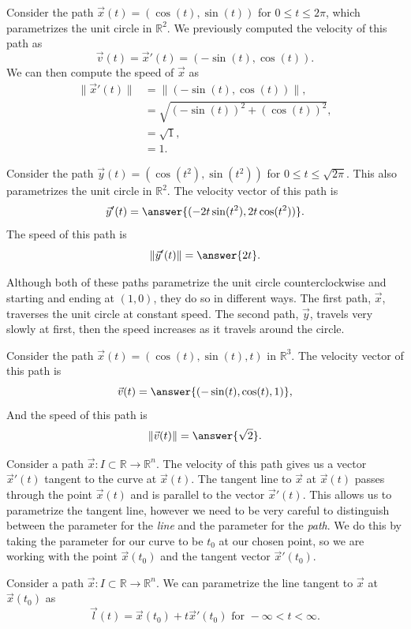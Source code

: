 \documentclass{ximera}
\begin{document}
\begin{example}
Consider the path $\vec{x}(t) = (\cos(t), \sin(t))$ for $0\leq t \leq 2\pi$, which parametrizes the unit circle in $\mathbb{R}^2$. We previously computed the velocity of this path as
\[
\vec{v}(t) = \vec{x}'(t) = (-\sin(t), \cos(t)).
\]
We can then compute the speed of $\vec{x}$ as
\begin{align*}
\|\vec{x}'(t)\| &= \|(-\sin(t), \cos(t))\|,\\
&= \sqrt{(-\sin(t))^2 + (\cos(t))^2},\\
& = \sqrt{1},\\
& = 1.
\end{align*}

Consider the path $\vec{y}(t) = (\cos(t^2), \sin(t^2))$ for $0\leq t\leq \sqrt{2\pi}$. This also parametrizes the unit circle in $\mathbb{R}^2$. The velocity vector of this path is
\[
\vec{y}'(t) = \answer{(-2t\sin(t^2), 2t\cos(t^2))}.
\]
The speed of this path is
\[
\|\vec{y}'(t)\| = \answer{2t}.
\]

Although both of these paths parametrize the unit circle counterclockwise and starting and ending at $(1,0)$, they do so in different ways. The first path, $\vec{x}$, traverses the unit circle at constant speed. The second path, $\vec{y}$, travels very slowly at first, then the speed increases as it travels around the circle.
\end{example}

\begin{example}
Consider the path $\vec{x}(t)=(\cos(t),\sin(t),t)$ in $\mathbb{R}^3$. The velocity vector of this path is
\[
\vec{v}(t) = \answer{(-\sin(t),\cos(t),1)},
\]
And the speed of this path is
\[
\|\vec{v}(t)\| = \answer{\sqrt{2}}.
\]
\end{example}

Consider a path $\vec{x}:I\subset\mathbb{R}\rightarrow\mathbb{R}^n$. The velocity of this path gives us a vector $\vec{x}'(t)$ tangent to the curve at $\vec{x}(t)$. The tangent line to $\vec{x}$ at $\vec{x}(t)$ passes through the point $\vec{x}(t)$ and is parallel to the vector $\vec{x}'(t)$. This allows us to parametrize the tangent line, however we need to be very careful to distinguish between the parameter for the \emph{line} and the parameter for the \emph{path}. We do this by taking the parameter for our curve to be $t_0$ at our chosen point, so we are working with the point $\vec{x}(t_0)$ and the tangent vector $\vec{x}'(t_0)$.

\begin{proposition}
Consider a path $\vec{x}:I\subset\mathbb{R}\rightarrow\mathbb{R}^n$. We can parametrize the line tangent to $\vec{x}$ at $\vec{x}(t_0)$ as
\[
\vec{l}(t) = \vec{x}(t_0) + t\vec{x}'(t_0) \textrm{ for } -\infty < t < \infty.
\]
\end{proposition}
\end{document}
